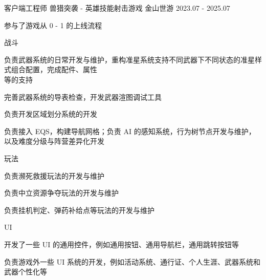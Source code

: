 

\begin{cventries}

\cventry
    {客户端工程师} %
    {兽猎突袭 -  英雄技能射击游戏} %
    {金山世游} %
    {2023.07 - 2025.07} %
    {
        \begin{cvitems}
            \item {参与了游戏从 0 - 1 的上线流程}
            \item {战斗
                \begin{cvsubitems}
                    \item {负责武器系统的日常开发与维护，重构准星系统支持不同武器下不同状态的准星样式组合配置，完成配件、属性\\等的支持}
                    \item {完善武器系统的导表检查，开发武器渲图调试工具}
                    \item {负责开发区域划分系统的开发}
                    \item {负责接入 EQS，构建导航网格；负责 AI 的感知系统，行为树节点开发与维护，以及难度分级与阵营差异化开发}
                \end{cvsubitems}
            }
            \item {玩法
                \begin{cvsubitems}
                    \item {负责濒死救援玩法的开发与维护}
                    \item {负责中立资源争夺玩法的开发与维护}
                    \item {负责挂机判定、弹药补给点等玩法的开发与维护}
                \end{cvsubitems}
            }
            \item {UI
                \begin{cvsubitems}
                    \item {开发了一些 UI 的通用控件，例如通用按钮、通用导航栏，通用跳转按钮等}
                    \item {负责游戏外一些 UI 系统的开发，例如活动系统、通行证、个人生涯、武器系统和武器个性化等}

\end{cvsubitems}}
\end{cvitems}}
\end{cventries}
